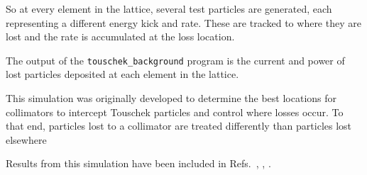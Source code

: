 \documentclass[11pt]{article}
\begin{document}
So at every element in the lattice, several test particles are generated, each representing 
a different energy kick and rate.  These are tracked to where they are lost and the rate is accumulated
at the loss location.

The output of the {\tt touschek_background} program is the current and power of lost particles deposited
at each element in the lattice.

This simulation was originally developed to determine the best locations for collimators to 
intercept Touschek particles and control where losses occur.  To that end, particles lost to a collimator
are treated differently than particles lost elsewhere

Results from this simulation have been included in Refs.~\cite{mpe:coll}, \cite{mpe:esp}, \cite{mpe:thesis}.
\end{document}
